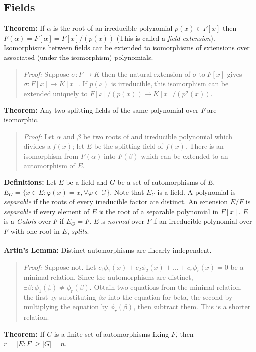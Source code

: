\subsection{Fields}
{\bf Theorem:}
If $\alpha$ is the root of an irreducible polynomial $p(x) \in F[x]$ then 
$F(\alpha)=F[\alpha]= F[x]/(p(x))$ (This is called a
\emph{field extension}).  Isomorphisms between fields can be extended
to isomorphisms of extensions over associated (under the isomorphism) polynomials.
\begin{quote}
\emph{Proof:} Suppose $\sigma: F \rightarrow K$ then the natural extension of $\sigma$ 
to $F[x]$ gives $\sigma: F[x] \rightarrow K[x]$.  If $p(x)$ is irreducible, this
isomorphism can be extended uniquely to $F[x]/(p(x)) \rightarrow K[x]/(p^{\sigma}(x))$.
\end{quote}
{\bf Theorem:} 
Any two splitting fields of the same polynomial over $F$ are isomorphic.  
\begin{quote}
\emph{Proof:}
Let $\alpha$ and $\beta$ be two roots of and irreducible polynomial which divides
a $f(x)$; let $E$ be the splitting field of $f(x)$.  There is an isomorphism from
$F(\alpha)$ into $F(\beta)$ which can be extended to an automorphism of $E$.  
\end{quote}
{\bf Definitions:}  Let $E$ be a field and $G$ be a set of automorphisms of $E$, 
$E_G = \{ x \in E: \varphi(x)=x, \forall \varphi \in G \}$.  Note that $E_G$ is a field.
A polynomial is \emph{separable} if the roots of every irreducible factor are distinct.
An extension $E/F$ is \emph{separable} if every element of $E$ is the root of a separable polynomial
in $F[x]$.
$E$ is a \emph{Galois} over $F$ if $E_G=F$.  
$E$ is \emph{normal} over $F$ if an irreducible
polynomial over $F$ with one root in $E$, \emph{splits}.
\\
\\
{\bf Artin's Lemma:} Distinct automorphisms are linearly independent.
\begin{quote}
\emph{Proof:}  Suppose not.  Let $c_1 \phi_1 (x) + c_2 \phi_2 (x) + \ldots + c_r \phi_r (x) =0$
be a minimal relation.  Since the automorphisms are distinct,
$\exists \beta: \phi_1 (\beta) \ne \phi_r (\beta)$.  Obtain two equations from the
minimal relation, the first
by substituting $\beta x$ into the equation for beta, the second by multiplying the
equation by $\phi_r(\beta)$, then subtract them.  This is a shorter relation.
\end{quote}
{\bf Theorem:} 
If $G$ is a finite set of automorphisms fixing $F$, then $r=|E:F| \geq |G|=n$.
